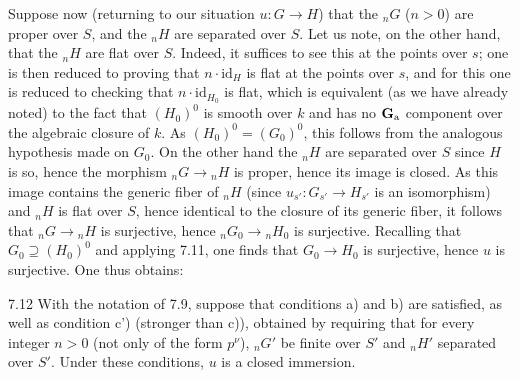 Suppose now (returning to our situation $u:G\to H$) that the ${}_nG$ ($n>0$) are proper over $S$, and the ${}_nH$ are separated over $S$. Let us note, on the other hand, that the ${}_nH$ are flat over $S$. Indeed, it suffices to see this at the points over $s$; one is then reduced to proving that $n\cdot\mathrm{id}_H$ is flat at the points over $s$, and for this one is reduced to checking that $n\cdot\mathrm{id}_{H_0}$ is flat, which is equivalent (as we have already noted) to the fact that $(H_0)^0$ is smooth over $k$ and has no $\mathbf{G}_{\mathrm{a}}$ component over the algebraic closure of $k$. As $(H_0)^0=(G_0)^0$, this follows from the analogous hypothesis made on $G_0$. On the other hand the ${}_nH$ are separated over $S$ since $H$ is so, hence the morphism ${}_nG\to{}_nH$ is proper, hence its image is closed. As this image contains the generic fiber of ${}_nH$ (since $u_{s'}:G_{s'}\to H_{s'}$ is an isomorphism) and ${}_nH$ is flat over $S$, hence identical to the closure of its generic fiber, it follows that ${}_nG\to{}_nH$ is surjective, hence ${}_nG_0\to{}_nH_0$ is surjective. Recalling that $G_0\supseteq(H_0)^0$ and applying 7.11, one finds that $G_0\to H_0$ is surjective, hence $u$ is surjective. One thus obtains:
\begin{proposition}{7.12}\label{VIII.7.12}
With the notation of 7.9, suppose that conditions a) and b) are satisfied, as well as condition c') (stronger than c)), obtained by requiring that for every integer $n>0$ (not only of the form $p^\nu$), ${}_nG'$ be finite over $S'$ and ${}_nH'$ separated over $S'$. Under these conditions, $u$ is a closed immersion.
\end{proposition}
